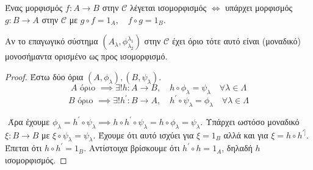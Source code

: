 \begin{defn} Ένας μορφισμός $f:A\rightarrow B$ στην $\mathcal{C}$ λέγεται ισομορφισμός $\iff$ υπάρχει μορφισμός $g:B\rightarrow A$ στην $\mathcal{C}$ με $g\circ f =1_A, \quad f\circ g = 1_B$.
\end{defn}

\vspace{0.3truecm}


\begin{prop} Αν το επαγωγικό σύστημα $(A_{\lambda},\phi^{\lambda_1}_{\lambda_2})$ στην $\mathcal{C}$ έχει όριο τότε αυτό είναι (μοναδικό) μονοσήμαντα ορισμένο ως προς ισομορφισμό.
\end{prop}

\begin{proof} Έστω δύο όρια $(A,\phi_{\lambda}), (B,\psi_{\lambda})$.
    $$A \text{ όριο } \implies \exists ! h : A\rightarrow B, \quad h\circ \phi_{\lambda} = \psi_{\lambda} \quad \forall \lambda \in \Lambda$$
    $$B \text{ όριο } \implies \exists ! h^{\prime} : B\rightarrow A, \quad h^{\prime}\circ \psi_{\lambda} = \phi_{\lambda} \quad \forall \lambda \in \Lambda$$

\begin{figure}[H]
        \centering
\end{figure}
$ $\newline
Άρα έχουμε $\phi_{\lambda} = h^{\prime} \circ \psi_{\lambda} \implies h \circ h^{\prime} \circ \psi_{\lambda} = h\circ \phi_{\lambda} = \psi_{\lambda}$. Υπάρχει ωστόσο μοναδικό $\xi:B\rightarrow B$ με $\xi \circ \psi_{\lambda} = \psi_{\lambda}$. Έχουμε ότι αυτό ισχύει για $\xi = 1_B$ αλλά και για $\xi = h\circ h^{\prime]}$. Έπεται ότι $h\circ h^{\prime} = 1_B$. Αντίστοιχα βρίσκουμε ότι $h^{\prime}\circ h = 1_A$, δηλαδή $h$ ισομορφισμός.
\end{proof}